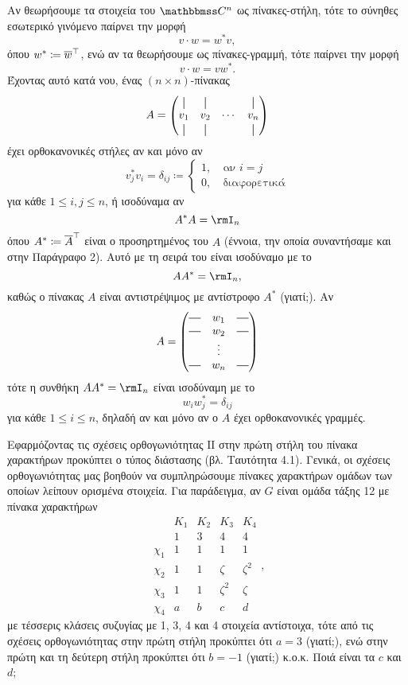 \documentclass[12pt,a4paper,reqno]{amsart}
\newcommand*{\vertbar}{\rule[-1ex]{0.5pt}{2.5ex}} %
\newcommand*{\horzbar}{\rule[.5ex]{2.5ex}{0.5pt}} %
\begin{document}
\begin{digression_la}
Αν θεωρήσουμε τα στοιχεία του $\CC^n$ ως πίνακες-στήλη, τότε το σύνηθες εσωτερικό γινόμενο παίρνει την μορφή
\[
v \cdot w = w^\ast v,
\]
όπου $w^\ast \coloneqq \overline{w}^\top$, ενώ αν τα θεωρήσουμε ως πίνακες-γραμμή, τότε παίρνει την μορφή 
\[
v \cdot w = vw^\ast.
\]
Έχοντας αυτό κατά νου, ένας $(n\times n)$-πίνακας 
\[
A = 
\begin{pmatrix}
\vertbar & \vertbar &        &  \vertbar \\
v_1      & v_2      & \cdots & v_n \\
\vertbar & \vertbar &        & \vertbar 
\end{pmatrix}
\] 
έχει ορθοκανονικές στήλες αν και μόνο αν 
\[
v_j^\ast v_i = \delta_{ij} \coloneqq
\begin{cases}
    1, &\ \text{αν $i=j$} \\
    0, &\ \text{διαφορετικά}
\end{cases}
\]
για κάθε $1 \le i, j \le n$, ή ισοδύναμα αν
\[
A^\ast A = \rmI_n
\]
όπου $A^\ast \coloneqq \overline{A}^\top$ είναι ο προσηρτημένος του $A$ (έννοια, την οποία συναντήσαμε και στην Παράγραφο 2). Αυτό με τη σειρά του είναι ισοδύναμο με το 
\[
AA^\ast = \rmI_n,
\]
καθώς ο πίνακας $A$ είναι αντιστρέψιμος με αντίστροφο $A^\ast$ (γιατί;). Αν 
\[
A = 
\begin{pmatrix}
    \horzbar & w_1    & \horzbar \\
    \horzbar & w_2    & \horzbar \\
             & \vdots &  \\
    \horzbar & w_n    & \horzbar
\end{pmatrix}
\]
τότε η συνθήκη $AA^\ast = \rmI_n$ είναι ισοδύναμη με το 
\[
w_iw_j^\ast = \delta_{ij}
\]
για κάθε $1 \le i \le n$, δηλαδή αν και μόνο αν ο $A$ έχει ορθοκανονικές γραμμές.
\end{digression_la}

Εφαρμόζοντας τις σχέσεις ορθογωνιότητας ΙΙ στην πρώτη στήλη του πίνακα χαρακτήρων προκύπτει ο τύπος διάστασης (βλ. Ταυτότητα 4.1). Γενικά, οι σχέσεις ορθογωνιότητας μας βοηθούν να συμπληρώσουμε πίνακες χαρακτήρων ομάδων των οποίων λείπουν ορισμένα στοιχεία. Για παράδειγμα, αν $G$ είναι ομάδα τάξης 12 με πίνακα χαρακτήρων 
\[
\renewcommand{\arraystretch}{1.2}
\begin{array}{l|c|c|c|c}
           & K_1 & K_2 & K_3     & K_4 \\
           & 1   & 3   & 4       & 4       \\ \hline 
    \chi_1 & 1   & 1   & 1       & 1       \\ \hline
    \chi_2 & 1   & 1   & \zeta   & \zeta^2  \\ \hline
    \chi_3 & 1   & 1   & \zeta^2 & \zeta   \\ \hline
    \chi_4 & a   & b   & c & d
\end{array},
\]
με τέσσερις κλάσεις συζυγίας με 1, 3, 4 και 4 στοιχεία αντίστοιχα, τότε από τις σχέσεις ορθογωνιότητας στην πρώτη στήλη προκύπτει ότι $a = 3$ (γιατί;), ενώ στην πρώτη και τη δεύτερη στήλη προκύπτει ότι $b=-1$ (γιατί;) κ.ο.κ. Ποιά είναι τα $c$ και $d$; 
\end{document}
